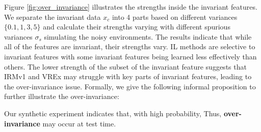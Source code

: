 


Figure \ref{fig:over_invariance} 
illustrates the strengths inside the invariant features. We separate the invariant data $x_c$ into 4 parts based on different variances $\{0.1,1,3,5\}$ and calculate their strengths varying with different spurious variances $\sigma_s$ simulating the noisy environments. 
The results indicate that while all of the features are invariant, their strengths vary.
IL methods are selective to invariant features with some invariant features being learned less effectively than others. 
The lower strength of the subset of the invariant feature suggests that IRMv1 and VREx may struggle with key parts of invariant features, leading to the over-invariance issue. 
Formally, we give the following informal proposition to further illustrate the over-invariance: 
\begin{remark}[Over-invariance issue]
Our synthetic experiment indicates that, with high probability, 
Thus, \textbf{over-invariance} may occur at test time.

\end{remark}

